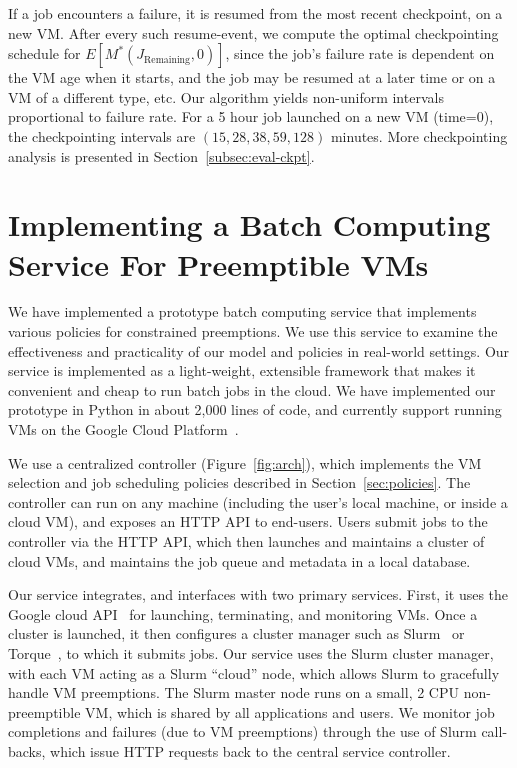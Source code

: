 \documentclass[sigconf]{acmart} %
\begin{document}
If a job encounters a failure, it is resumed from the most recent checkpoint, on a new VM.
After every such resume-event, we compute the optimal checkpointing schedule for $E[M^*(J_{\text{Remaining}}, 0)]$, since the job's failure rate is dependent on the VM age when it starts, and the job may be resumed at a later time or on a VM of a different type, etc.
Our algorithm yields non-uniform intervals proportional to failure rate.
For a 5 hour job launched on a new VM (time=0), the checkpointing intervals are $(15, 28, 38, 59, 128)$ minutes.
More checkpointing analysis is presented in Section~\ref{subsec:eval-ckpt}. 

\section{Implementing a Batch Computing Service For Preemptible VMs}
\label{sec:impl}

We have implemented a prototype batch computing service that implements various policies for constrained preemptions. 
We use this service to examine the effectiveness and practicality of our model and policies in real-world settings. 
Our service is implemented as a light-weight, extensible framework that makes it convenient and cheap to run batch jobs in the cloud. 
We have implemented our prototype in Python in about 2,000 lines of code, and currently support running VMs on the Google Cloud Platform~\cite{gcp}. 

We use a centralized controller (Figure~\ref{fig:arch}), which implements the VM selection and job scheduling policies described in Section~\ref{sec:policies}. 
The controller can run on any machine (including the user's local machine, or inside a cloud VM), and exposes an HTTP API to end-users. 
Users submit jobs to the controller via the HTTP API, which then launches and maintains a cluster of cloud VMs, and maintains the job queue and metadata in a local database. 

Our service integrates, and interfaces with two primary services.
First, it uses the Google cloud API~\cite{gcloud-api} for launching, terminating, and monitoring VMs.
Once a cluster is launched, it then configures a cluster manager such as Slurm~\cite{slurm} or Torque~\cite{torque}, to which it submits jobs. 
Our service uses the Slurm cluster manager, with each VM acting as a Slurm ``cloud'' node, which allows Slurm to gracefully handle VM preemptions.
The Slurm master node runs on a small, 2 CPU non-preemptible VM, which is shared by all applications and users. 
We monitor job completions and failures (due to VM preemptions) through the use of Slurm call-backs, which issue HTTP requests back to the central service controller. 
\end{document}
